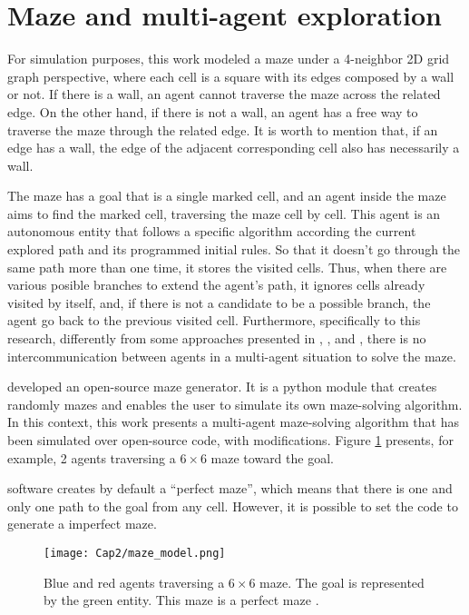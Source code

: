 \section{Maze and multi-agent exploration}
\label{section_models_maze}
For simulation purposes, this work modeled a maze under a 4-neighbor 2D grid graph perspective, where each cell is a square with its edges composed by a wall or not. If there is a wall, an agent cannot traverse the maze across the related edge. On the other hand, if there is not a wall, an agent has a free way to traverse the maze through the related edge. It is worth to mention that, if an edge has a wall, the edge of the adjacent corresponding cell also has necessarily a wall.

The maze has a goal that is a single marked cell, and an agent inside the maze aims to find the marked cell, traversing the maze cell by cell. This agent is an autonomous entity that follows a specific algorithm according the current explored path and its programmed initial rules. So that it doesn't go through the same path more than one time, it stores the visited cells. Thus, when there are various posible branches to extend the agent's path, it ignores cells already visited by itself, and, if there is not a candidate to be a possible branch, the agent go back to the previous visited cell. Furthermore, specifically to this research, differently from some approaches presented in , , and , there is no intercommunication between agents in a multi-agent situation to solve the maze.

 developed an open-source maze generator. It is a python module that creates randomly mazes and enables the user to simulate its own maze-solving algorithm. In this context, this work presents a multi-agent maze-solving algorithm that has been simulated over  open-source code, with modifications. Figure \ref{maze_model} presents, for example, 2 agents traversing a $6 \times 6$ maze toward the goal.

 software creates by default a ``perfect maze'', which means that there is one and only one path to the goal from any cell. However, it is possible to set the code to generate a imperfect maze.

\begin{figure}[ht!]
\centering
\texttt{[image: Cap2/maze\_model.png]}
\caption{Blue and red agents traversing a $6\times 6$ maze. The goal is represented by the green entity. This maze is a perfect maze \cite{Muhammad2021}.}
\label{maze_model}
\end{figure}

